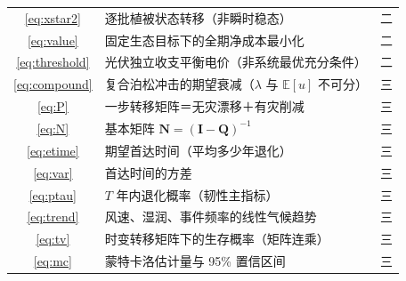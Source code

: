 \documentclass[11pt,a4paper]{ctexart}
\newcommand{\E}{\mathbb{E}}
\begin{document}
\begin{longtable}{|c|p{7.4cm}|c|}
\eqref{eq:xstar2} & 逐批植被状态转移（非瞬时稳态） & 二 \\
\eqref{eq:value} & 固定生态目标下的全期净成本最小化 & 二 \\
\eqref{eq:threshold} & 光伏独立收支平衡电价（非系统最优充分条件） & 二 \\
\eqref{eq:compound} & 复合泊松冲击的期望衰减（$\lambda$ 与 $\E[u]$ 不可分） & 三 \\
\eqref{eq:P} & 一步转移矩阵＝无灾漂移＋有灾削减 & 三 \\
\eqref{eq:N} & 基本矩阵 $\bm{N}=(\bm{I}-\bm{Q})^{-1}$ & 三 \\
\eqref{eq:etime} & 期望首达时间（平均多少年退化） & 三 \\
\eqref{eq:var} & 首达时间的方差 & 三 \\
\eqref{eq:ptau} & $T$ 年内退化概率（韧性主指标） & 三 \\
\eqref{eq:trend} & 风速、湿润、事件频率的线性气候趋势 & 三 \\
\eqref{eq:tv} & 时变转移矩阵下的生存概率（矩阵连乘） & 三 \\
\eqref{eq:mc} & 蒙特卡洛估计量与 95\% 置信区间 & 三 \\
\hline
\end{longtable}



\end{document}
